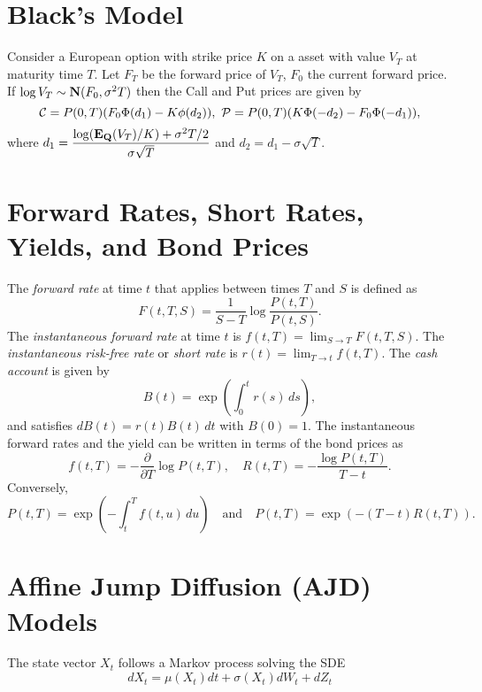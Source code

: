 \documentclass[twocolumn]{amsart}
\begin{document}
\section*{Black's Model}

Consider a European option with strike price $K$ on a asset with value $V_T$ at maturity time $T$. Let $F_T$ be the forward price of $V_T$, $F_0$ the current forward price. If $\log V_T \sim \mathbf{N}(F_0, \sigma^2 T)$ then the Call and Put prices are given by
\begin{equation*}
\mathcal{C} = P(0,T) (F_0 \Phi(d_1) - K \phi(d_2)), \,\, \mathcal{P} = P(0,T) (K \Phi(-d_2) - F_0 \Phi(-d_1)),
\end{equation*}
where $\displaystyle d_1 = \frac{\log(\mathbf{E}_\mathbf{Q}(V_T)/K) + \sigma^2T/2}{\sigma \sqrt{T}}$ and $d_2 = d_1 - \sigma \sqrt{T}$.

\section*{Forward Rates, Short Rates, Yields, and Bond Prices}

The \emph{forward rate} at time $t$ that applies between times $T$ and $S$ is defined as
\begin{equation*}
    F(t,T,S) = \frac{1}{S-T}\log \frac{P(t,T)}{P(t,S)}.
\end{equation*}
The \emph{instantaneous forward rate} at time $t$ is $f(t,T) = \lim_{S \to T} F(t,T,S)$. The \emph{instantaneous risk-free rate} or \emph{short rate} is $r(t) = \lim_{T \to t} f(t,T)$. The \emph{cash account} is given by
\begin{equation*}
    B(t) = \exp\left(\int_0^t r(s)\,ds\right),
\end{equation*}
and satisfies $dB(t) = r(t) B(t)\,dt$ with $B(0)=1$. The instantaneous forward rates and the yield can be written in terms of the bond prices as
\[ f(t,T) = - \frac{\partial}{\partial T} \log P(t,T), \quad R(t,T) = - \frac{\log P(t,T)}{T-t}. \]
Conversely,
\[ P(t,T) = \exp \left(- \int_t^T f(t,u)\,du \right)\quad \text{and} \quad P(t,T) = \exp(-(T-t)R(t,T)). \]

\section*{Affine Jump Diffusion (AJD) Models}

The state vector $X_t$ follows a Markov process solving the SDE
\begin{equation*}
dX_t=\mu(X_t)dt +\sigma(X_t)dW_t + dZ_t
\end{equation*}
\end{document}
